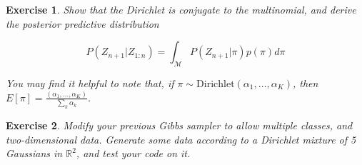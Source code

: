 \documentclass[twoside]{article}
\newcounter{lecnum}
\newtheorem{exercise}{Exercise}[lecnum]
\begin{document}
\begin{exercise}
 Show that the Dirichlet is conjugate to the multinomial, and derive the posterior predictive distribution

  $$P(Z_{n+1}|Z_{1:n}) = \int_{\mathcal{M}} P(Z_{n+1}|\pi)p(\pi) d\pi$$

  You may find it helpful to note that, if $\pi\sim \mbox{Dirichlet}(\alpha_1,\dots,\alpha_K)$, then $E[\pi] = \frac{(\alpha_1,\dots,\alpha_K)}{\sum_k\alpha_k}$.
\end{exercise}





 \begin{exercise}
   Modify your previous Gibbs sampler to allow multiple classes, and two-dimensional data. Generate some data according to a Dirichlet mixture of 5 Gaussians in $\mathbb{R}^2$, and test your code on it.

\end{exercise}
\end{document}
